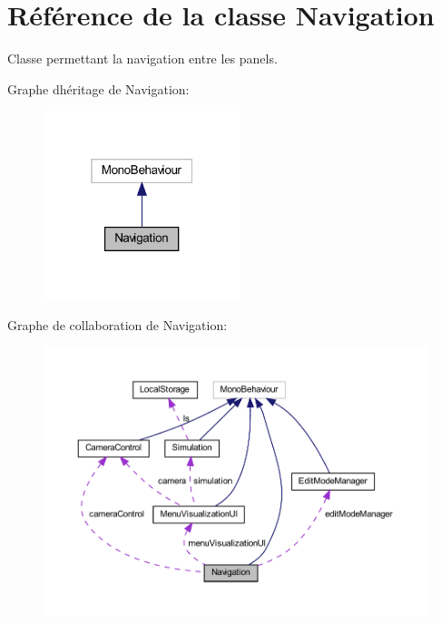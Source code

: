 \hypertarget{class_navigation}{}\section{Référence de la classe Navigation}
\label{class_navigation}


Classe permettant la navigation entre les panels.  




Graphe d\textquotesingle{}héritage de Navigation\+:\nopagebreak
\begin{figure}[H]
\begin{center}
\leavevmode
\includegraphics[width=163pt]{class_navigation__inherit__graph}
\end{center}
\end{figure}


Graphe de collaboration de Navigation\+:
\nopagebreak
\begin{figure}[H]
\begin{center}
\leavevmode
\includegraphics[width=350pt]{class_navigation__coll__graph}
\end{center}
\end{figure}
